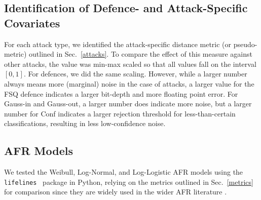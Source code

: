 \begin{itemize}
\end{itemize}




\subsection{Identification of Defence- and Attack-Specific Covariates}
For each attack type, we identified the attack-specific distance metric (or pseudo-metric) outlined in Sec.~\ref{attacks}. To compare the effect of this measure against other attacks, the value was min-max scaled so that all values fall on the interval $[0,1]$. For defences, we did the same scaling. However, while a larger number always means more (marginal) noise in the case of attacks, a larger value for the FSQ defence indicates a larger bit-depth and more floating point error. For Gauss-in and Gauss-out, a larger number does indicate more noise, but a larger number for Conf indicates a larger rejection threshold for less-than-certain classifications, resulting in less low-confidence noise. 


\subsection{AFR Models}
We tested the Weibull, Log-Normal, and Log-Logistic AFR models using the \texttt{lifelines}~\citep{lifelines} package in Python, relying on the metrics outlined in Sec.~\ref{metrics} for comparison since they are widely used in the wider AFR literature \citep{aft_models}.
